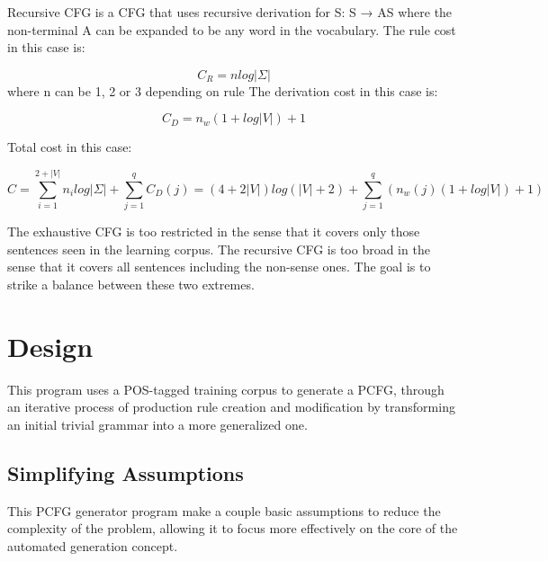 \documentclass[paper=a4, fontsize=11pt]{scrartcl} %
\numberwithin{equation}{section} %
\numberwithin{figure}{section} %
\numberwithin{table}{section} %
\begin{document}
\begin{enumerate}[1.]
Recursive CFG is a CFG that uses recursive derivation for S: S → AS where the non-terminal A can be expanded to be any word in the vocabulary.
The rule cost in this case is:

\begin{equation}\label{first}
C_R = n log \lvert \Sigma \rvert
\end{equation}
where n can be 1, 2 or 3 depending on rule
The derivation cost in this case is:

\begin{equation}\label{first}
C_D = n_w(1 + log \lvert V \rvert) + 1
\end{equation}

Total cost in this case:

\begin{equation}\label{first}
C = \sum \limits_{i=1}^{2+\lvert V \rvert}n_i log \lvert \Sigma \rvert + \sum \limits_{j=1}^q C_D(j) = (4 + 2\lvert V \rvert)log(\lvert V \rvert + 2) + \sum \limits_{j=1}^q (n_w(j)(1 + log \lvert V \rvert) + 1)
\end{equation}

\end{enumerate}

The exhaustive CFG is too restricted in the sense that it covers only those sentences seen in the learning corpus. The recursive CFG is too broad in the sense that it covers all sentences including the non-sense ones. The goal is to strike a balance between these two extremes.


\section{Design}

This program uses a POS-tagged training corpus to generate a PCFG, through an iterative process of production rule creation and modification by transforming an initial trivial grammar into a more generalized one.

\subsection{Simplifying Assumptions}

This PCFG generator program make a couple basic assumptions to reduce the complexity of the problem, allowing it to focus more effectively on the core of the automated generation concept.
\end{document}
